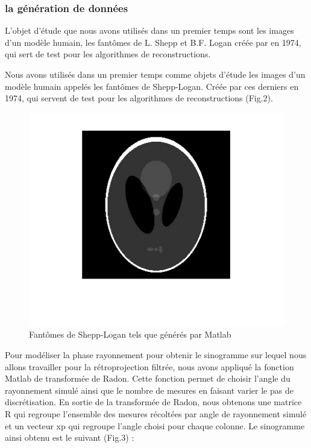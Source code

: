 \documentclass[conference]{IEEEtran}
\begin{document}
\subsubsection{la génération de données }

L'objet d'étude que nous avons utilisés dans un premier temps sont les images d'un modèle humain, les fantômes de L. Shepp et B.F. Logan créée par  en 1974, qui sert de test pour les algorithmes de reconstructions.

Nous avons utilisés dans un premier temps comme objets d'étude les images d'un modèle humain appelés les fantômes de Shepp-Logan. Créée par ces derniers en 1974, qui servent de test pour les algorithmes de reconstructions (Fig.2).

\begin{figure}[H]
\centering
\includegraphics[scale=0.7]{Shepp-logan}
\caption[Fantômes de Shepp-Logan tels que générés par Matlab]{Fantômes de Shepp-Logan tels que générés par Matlab}
\label{fig:gallery}
\end{figure}

Pour modéliser la phase rayonnement pour obtenir le sinogramme sur lequel nous allons travailler pour la rétroprojection filtrée, nous avons appliqué la fonction Matlab de transformée de Radon. Cette fonction permet de choisir l'angle du rayonnement simulé ainsi que le nombre de mesures en faisant varier le pas de discrétisation.
En sortie de la transformée de Radon, nous obtenons une matrice R qui regroupe l'ensemble des mesures récoltées par angle de rayonnement simulé et un vecteur xp qui regroupe l'angle choisi pour chaque colonne. Le sinogramme ainsi obtenu est le suivant (Fig.3) :
\end{document}
